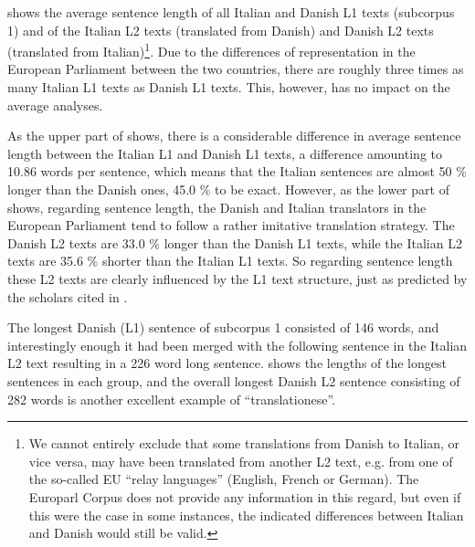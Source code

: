 \documentclass[output=paper]{LSP/langsci}
\begin{document}
 shows the average sentence length of all Italian and Danish L1 texts (subcorpus 1) and of the Italian L2 texts (translated from Danish) and Danish L2 texts (translated from Italian)\footnote{We cannot entirely exclude that some translations from Danish to Italian, or vice versa, may have been translated from another L2 text, e.g. from one of the so-called EU ``relay languages'' (English, French or German). The Europarl Corpus does not provide any information in this regard, but even if this were the case in some instances, the indicated differences between Italian and Danish would still be valid.}. Due to the differences of representation in the European Parliament between the two countries, there are roughly three times as many Italian L1 texts as Danish L1 texts. This, however, has no impact on the average analyses. 

As the upper part of  shows, there is a considerable difference in average sentence length between the Italian L1 and Danish L1 texts, a difference amounting to 10.86 words per sentence, which means that the Italian sentences are almost 50 \% longer than the Danish ones, 45.0 \% to be exact. However, as the lower part of  shows, regarding sentence length, the Danish and Italian translators in the European Parliament tend to follow a rather imitative translation strategy. The Danish L2 texts are 33.0 \% longer than the Danish L1 texts, while the Italian L2 texts are 35.6 \% shorter than the Italian L1 texts. So regarding sentence length these L2 texts are clearly influenced by the L1 text structure, just as predicted by the scholars cited in . 

The longest Danish (L1) sentence of subcorpus 1 consisted of 146 words, and interestingly enough it had been merged with the following sentence in the Italian L2 text resulting in a 226 word long sentence.  shows the lengths of the longest sentences in each group, and the overall longest Danish L2 sentence consisting of 282 words is another excellent example of ``translationese''. 


\begin{table}
\caption{Longest sentence lengths in Europarl texts.}
\label{tab:korzen:3}
\end{table}
\end{document}
